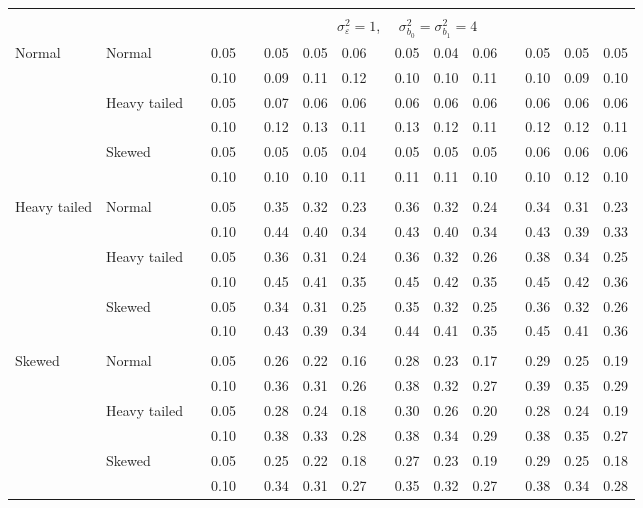 \documentclass{article} %
\begin{document}
\begin{table}[ht]
\begin{scriptsize}
\begin{center}
\begin{tabular}{ll p{.1cm} c p{.1cm} rrr p{.1cm} rrr p{.1cm} rrr}
&&&&&&&&&&&&&&&\\
& && && \multicolumn{9}{c}{$\sigma_{\varepsilon}^2 = 1$, \ \ $\sigma_{b_0}^2 = \sigma_{b_1}^2 = 4$} \\ \cline{6-16}
\rowcolor{gray!20}Normal       & Normal       && 0.05 &&   0.05 & 0.05 & 0.06 && 0.05 & 0.04 & 0.06 && 0.05 & 0.05 & 0.05 \\
\rowcolor{gray!20}             &              && 0.10 &&   0.09 & 0.11 & 0.12 && 0.10 & 0.10 & 0.11 && 0.10 & 0.09 & 0.10 \\
\rowcolor{gray!20}             & Heavy tailed && 0.05 &&   0.07 & 0.06 & 0.06 && 0.06 & 0.06 & 0.06 && 0.06 & 0.06 & 0.06 \\
\rowcolor{gray!20}             &              && 0.10 &&   0.12 & 0.13 & 0.11 && 0.13 & 0.12 & 0.11 && 0.12 & 0.12 & 0.11 \\
\rowcolor{gray!20}             & Skewed       && 0.05 &&   0.05 & 0.05 & 0.04 && 0.05 & 0.05 & 0.05 && 0.06 & 0.06 & 0.06 \\
\rowcolor{gray!20}             &              && 0.10 &&   0.10 & 0.10 & 0.11 && 0.11 & 0.11 & 0.10 && 0.10 & 0.12 & 0.10 \\
             &&&&&&&&&&&&&&&\\
Heavy tailed & Normal       && 0.05 &&   0.35 & 0.32 & 0.23 && 0.36 & 0.32 & 0.24 &&  0.34 & 0.31 & 0.23 \\
             &              && 0.10 &&   0.44 & 0.40 & 0.34 && 0.43 & 0.40 & 0.34 &&  0.43 & 0.39 & 0.33 \\
             & Heavy tailed && 0.05 &&   0.36 & 0.31 & 0.24 && 0.36 & 0.32 & 0.26 &&  0.38 & 0.34 & 0.25 \\
             &              && 0.10 &&   0.45 & 0.41 & 0.35 && 0.45 & 0.42 & 0.35 &&  0.45 & 0.42 & 0.36 \\
             & Skewed       && 0.05 &&   0.34 & 0.31 & 0.25 && 0.35 & 0.32 & 0.25 &&  0.36 & 0.32 & 0.26 \\
             &              && 0.10 &&   0.43 & 0.39 & 0.34 && 0.44 & 0.41 & 0.35 &&  0.45 & 0.41 & 0.36 \\
             &&&&&&&&&&&&&&&\\
Skewed       & Normal       && 0.05 &&   0.26 & 0.22 & 0.16 && 0.28 & 0.23 & 0.17 && 0.29 & 0.25 & 0.19 \\
             &              && 0.10 &&   0.36 & 0.31 & 0.26 && 0.38 & 0.32 & 0.27 && 0.39 & 0.35 & 0.29 \\
             & Heavy tailed && 0.05 &&   0.28 & 0.24 & 0.18 && 0.30 & 0.26 & 0.20 && 0.28 & 0.24 & 0.19 \\
             &              && 0.10 &&   0.38 & 0.33 & 0.28 && 0.38 & 0.34 & 0.29 && 0.38 & 0.35 & 0.27 \\
             & Skewed       && 0.05 &&   0.25 & 0.22 & 0.18 && 0.27 & 0.23 & 0.19 && 0.29 & 0.25 & 0.18 \\
             &              && 0.10 &&   0.34 & 0.31 & 0.27 && 0.35 & 0.32 & 0.27 && 0.38 & 0.34 & 0.28 \\



\end{tabular}
\end{center}
\end{scriptsize}
\end{table}
\end{document}
